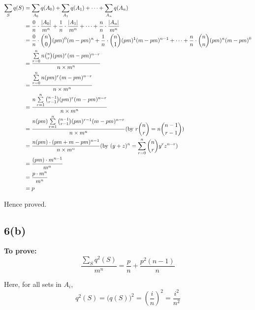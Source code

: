 \documentclass[12pt]{article}
\begin{document}
\begin{align*}
\sum_{S} q(S) 
    &= \sum_{A_0} q(A_0) + \sum_{A_1} q(A_1) + \dots + \sum_{A_n} q(A_n) \\
    &= \frac{0}{n} \cdot \frac{|A_0|}{m^n} + \frac{1}{n} \cdot \frac{|A_1|}{m^n} + \dots + \frac{n}{n} \cdot \frac{|A_n|}{m^n} \\
    &= \frac{0}{n} \cdot \binom{n}{0}(pm)^0(m-pm)^n + \frac{1}{n} \cdot \binom{n}{1}(pm)^1(m-pm)^{n-1} + \dots + \frac{n}{n} \cdot \binom{n}{n}(pm)^n(m-pm)^0 \\
    &= \frac{\sum\limits_{r=0}^{n} n \binom{n}{r}(pm)^r(m-pm)^{n-r}}{n \times m^n} \\
    &= \frac{\sum\limits_{r=0}^{n} n (pm)^r(m-pm)^{n-r}}{n \times m^n} \\
    &= \frac{n \sum\limits_{r=1}^{n} \binom{n-1}{r-1}(pm)^r(m-pm)^{n-r}}{n \times m^n} \\ 
    &= \frac{n(pm) \sum\limits_{r=1}^{n} \binom{n-1}{r-1}(pm)^{r-1}(m-pm)^{n-r}}{n \times m^n} \hfill \text{(by $r\binom{n}{r} = n\binom{n-1}{r-1})$ }\\
    &= \frac{n(pm) \cdot (pm + m - pm)^{n-1}}{n \times m^n} 
       \hfill \text{(by $(y+z)^n = \sum_{r=0}^n \binom{n}{r} y^r z^{n-r}$)} \\
    &= \frac{(pm) \cdot m^{n-1}}{m^n} \\
    &= \frac{p \cdot m^n}{m^n} \\
    &= p
\end{align*}

Hence proved.
\subsection{6(b)}
\textbf{To prove:}  
\[
\frac{\sum\limits_S q^2(S)}{m^n} = \frac{p}{n} + \frac{p^2 (n-1)}{n}
\]

Here, for all sets in $A_i$,  
\[
q^2(S) = \big(q(S)\big)^2 = \left( \frac{i}{n} \right)^2 = \frac{i^2}{n^2}
\]
\end{document}
